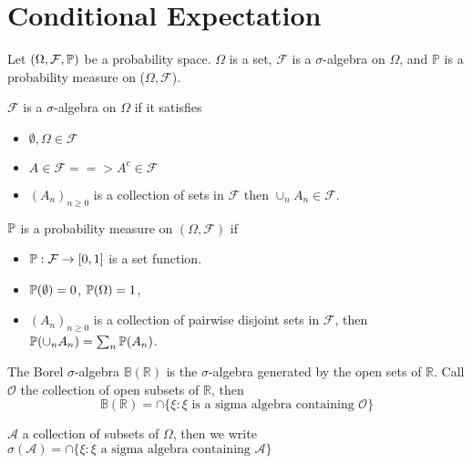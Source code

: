 \chapter{Conditional Expectation}
\label{cha:cond-expect}

Let $(\Omega, \mathcal{F}, \Prob)$ be a probability space.
$\Omega$ is a set, $\mathcal{F}$ is a $\sigma$-algebra on $\Omega$,
and $\mathbb{P}$ is a probability measure on ($\Omega, \mathcal{F}$).

\begin{defn}
  \label{defn:1}
  $\mathcal{F}$ is a $\sigma$-algebra on $\Omega$ if it satisfies
  \begin{itemize}
  \item $\emptyset, \Omega \in \mathcal{F}$
  \item $A \in \mathcal{F} ==> A^{c} \in \mathcal{F}$
  \item $(A_n)_{n \geq 0}$ is a collection of sets in $\mathcal{F}$
    then $\cup_{n} A_{n} \in \mathcal{F}$.
  \end{itemize}
\end{defn}

\begin{defn}
  \label{defn:2}
  $\Prob$ is a probability measure on $(\Omega, \mathcal{F})$ if
  \begin{itemize}
  \item $\Prob: \mathcal{F} \rightarrow [0, 1]$ is a set function.
  \item $\Prob{\emptyset} = 0$, $\Prob{\Omega} = 1$,
  \item $(A_{n})_{n \geq 0}$ is a collection of pairwise disjoint
      sets in $\mathcal{F}$, then $\Prob{\cup_{n} A_{n}} =
      \sum_{n} \Prob{A_{n}}$.
  \end{itemize}
\end{defn}

\begin{defn}
  \label{defn:3}
  The Borel $\sigma$-algebra $\mathbb{B}(\mathbb{R})$ is the
  $\sigma$-algebra generated by the open sets of $\mathbb{R}$.  Call
  $\mathcal{O}$ the collection of open subsets of $\mathbb{R}$, then
  \begin{equation}
    \label{eq:1}
    \mathbb{B}(\mathbb{R}) = \cap \{ \xi: \xi \text{ is a sigma
      algebra containing $\mathcal{O}$} \}
  \end{equation}
\end{defn}

\begin{defn}
  \label{defn:4}
  $\mathcal{A}$ a collection of subsets of $\Omega$, then we write
  $\sigma(\mathcal{A}) = \cap \{ \xi: \xi \text{ a sigma algebra
    containing $\mathcal{A}$} \}$
\end{defn}


